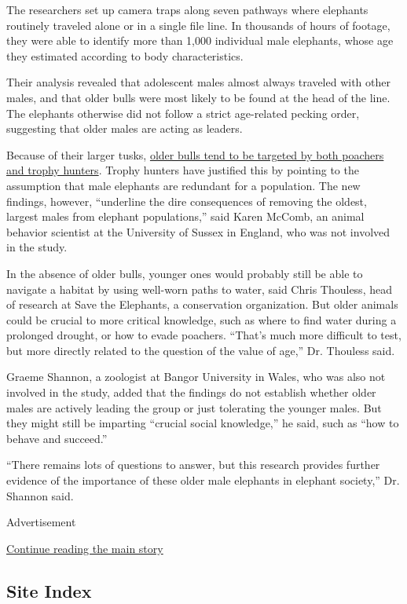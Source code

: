 The researchers set up camera traps along seven pathways where elephants
routinely traveled alone or in a single file line. In thousands of hours
of footage, they were able to identify more than 1,000 individual male
elephants, whose age they estimated according to body characteristics.

Their analysis revealed that adolescent males almost always traveled
with other males, and that older bulls were most likely to be found at
the head of the line. The elephants otherwise did not follow a strict
age-related pecking order, suggesting that older males are acting as
leaders.

Because of their larger tusks,
\href{https://www.nytimes3xbfgragh.onion/2017/12/04/science/elephants-lions-africa-hunting.html}{older
bulls tend to be targeted by both poachers and trophy hunters}. Trophy
hunters have justified this by pointing to the assumption that male
elephants are redundant for a population. The new findings, however,
``underline the dire consequences of removing the oldest, largest males
from elephant populations,'' said Karen McComb, an animal behavior
scientist at the University of Sussex in England, who was not involved
in the study.

In the absence of older bulls, younger ones would probably still be able
to navigate a habitat by using well-worn paths to water, said Chris
Thouless, head of research at Save the Elephants, a conservation
organization. But older animals could be crucial to more critical
knowledge, such as where to find water during a prolonged drought, or
how to evade poachers. ``That's much more difficult to test, but more
directly related to the question of the value of age,'' Dr. Thouless
said.

Graeme Shannon, a zoologist at Bangor University in Wales, who was also
not involved in the study, added that the findings do not establish
whether older males are actively leading the group or just tolerating
the younger males. But they might still be imparting ``crucial social
knowledge,'' he said, such as ``how to behave and succeed.''

``There remains lots of questions to answer, but this research provides
further evidence of the importance of these older male elephants in
elephant society,'' Dr. Shannon said.

Advertisement

\protect\hyperlink{after-bottom}{Continue reading the main story}

\hypertarget{site-index}{%
\subsection{Site Index}\label{site-index}}

